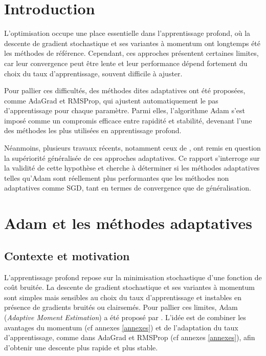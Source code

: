 \documentclass[a4paper,12pt]{article}
\begin{document}
\newpage
\tableofcontents
\listoffigures
\listoftables
\newpage

\section{Introduction}

L’optimisation occupe une place essentielle dans l’apprentissage
profond, où la descente de gradient stochastique et ses variantes à
momentum ont longtemps été les méthodes de référence. Cependant, ces
approches présentent certaines limites, car leur convergence peut être
lente et leur performance dépend fortement du choix du taux
d’apprentissage, souvent difficile à ajuster.

Pour pallier ces difficultés, des méthodes dites adaptatives ont été
proposées, comme AdaGrad et RMSProp, qui ajustent automatiquement le pas
d’apprentissage pour chaque paramètre. Parmi elles, l’algorithme Adam
\cite{kingma2014} s’est imposé comme un compromis efficace entre
rapidité et stabilité, devenant l’une des méthodes les plus utilisées en
apprentissage profond.

Néanmoins, plusieurs travaux récents, notamment ceux de \cite{wilson2017}, ont remis en question la supériorité généralisée de ces
approches adaptatives. Ce rapport s’interroge sur la validité de cette
hypothèse et cherche à déterminer si les méthodes adaptatives telles
qu’Adam sont réellement plus performantes que les méthodes non
adaptatives comme SGD, tant en termes de convergence que de
généralisation.


\section{Adam et les méthodes adaptatives}

\subsection{Contexte et motivation}

L'apprentissage profond repose sur la minimisation stochastique d'une fonction de coût
bruitée. La descente de gradient stochastique et ses variantes à momentum sont simples
mais sensibles au choix du taux d'apprentissage et instables en présence de gradients bruités
ou clairsemés. Pour pallier ces limites, Adam (\emph{Adaptive Moment Estimation}) a été
proposé par \cite{kingma2014}. L'idée est de combiner les avantages du momentum (cf annexes \ref{annexes}) et de
l'adaptation du taux d'apprentissage, comme dans AdaGrad et RMSProp (cf annexes \ref{annexes}), afin d'obtenir une
descente plus rapide et plus stable.
\end{document}
